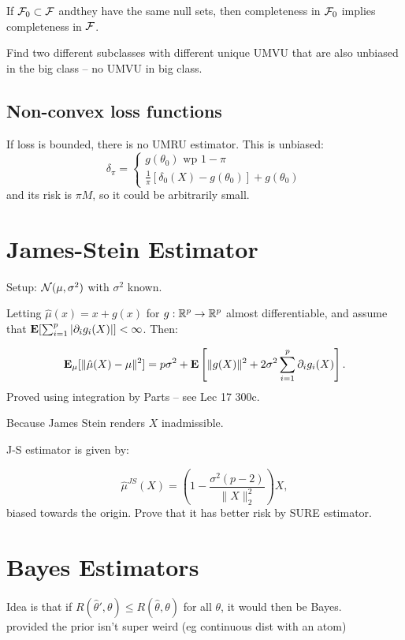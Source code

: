 \documentclass{article}
\begin{document}
\begin{fact}
If $\mathcal F_0 \subset \mathcal F$ andthey have the same null sets, then completeness in $\mathcal F_0$ implies completeness in $\mathcal F$. 
\end{fact}
\begin{recipe}
Find two different subclasses with different unique UMVU that are also unbiased in the big class -- no UMVU in big class.	
\end{recipe}
\subsection{Non-convex loss functions}
If loss is bounded, there is no UMRU estimator. This is unbiased:
$$\delta_\pi = \begin{cases}
	g(\theta_0) \text{ wp } 1-\pi\\
	\frac 1 \pi [\delta_0 (X) - g(\theta_0)] + g(\theta_0)
\end{cases}$$
and its risk is $\pi M$, so it could be arbitrarily small. 
\section{James-Stein Estimator}
Setup: $\mathcal N(\mu,\sigma^2)$ with $\sigma^2$ known. 

\begin{theorem}
Letting $\hat \mu(x) = x+g(x)$ for $g: \mathbb R^p \to \mathbb R^p$ almost differentiable, and assume that $\mathbf{E}[\sum_{i=1}^p |\partial_i g_i (X)|] <\infty$. Then:

$$\mathbf{E}_\mu[\|\hat \mu(X) - \mu\|^2] = p\sigma^2 + \mathbf{E}\left[\|g(X)\|^2 + 2\sigma^2 \sum_{i=1}^p \partial_i g_i(X)\right].$$
Proved using integration by Parts -- see Lec 17 300c.
\end{theorem}
\begin{fact}
Because James Stein renders $X$ inadmissible. 	
\end{fact}

J-S estimator is given by:

$$\hat \mu^{JS} (X) = \left ( 1-\frac{\sigma^2(p-2)}{\|X\|_2^2}\right)X,$$
biased towards the origin. Prove that it has better risk by SURE estimator. 

\section{Bayes Estimators}
\begin{fact}
Idea is that if $R(\hat \theta ' ,\theta) \leq R(\hat \theta , \theta)$ for all $\theta$, it would then be Bayes. \\ provided the prior isn't super weird (eg continuous dist with an atom) 

\end{fact}
\end{document}
